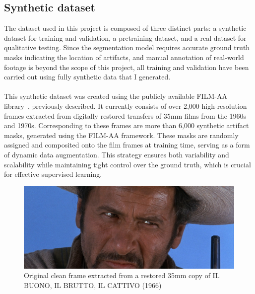 \documentclass[openany, 12pt]{article}
\begin{document}
{	\subsection{Synthetic dataset}
	The dataset used in this project is composed of three distinct parts: a synthetic dataset for training and validation, a pretraining dataset, and a real dataset for qualitative testing. Since the segmentation model requires accurate ground truth masks indicating the location of artifacts, and manual annotation of real-world footage is beyond the scope of this project, all training and validation have been carried out using fully synthetic data that I generated.\\\\
	This synthetic dataset was created using the publicly available FILM-AA library~\cite{ivanova23analogue}, previously described. It currently consists of over 2,000 high-resolution frames extracted from digitally restored transfers of 35mm films from the 1960s and 1970s. Corresponding to these frames are more than 6,000 synthetic artifact masks, generated using the FILM-AA framework. These masks are randomly assigned and composited onto the film frames at training time, serving as a form of dynamic data augmentation. This strategy ensures both variability and scalability while maintaining tight control over the ground truth, which is crucial for effective supervised learning.
	\begin{figure}[h!]
		\centering
		\includegraphics[width=0.7\linewidth]{images/bueno_feo_malo_frame_0131.png}
		\caption{\smaller Original clean frame extracted from a restored 35mm copy of IL BUONO, IL BRUTTO, IL CATTIVO (1966)} 
	\end{figure}
		\begin{figure}[h!]
		\centering

\end{figure}}
\end{document}
